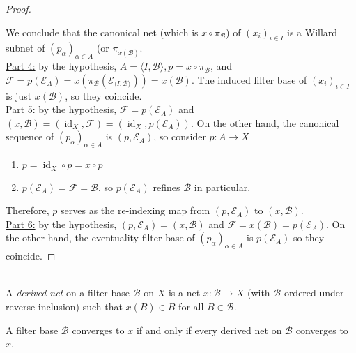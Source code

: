 \documentclass{treatise}
\begin{document}
\begin{proof}
\begin{enumerate}
\end{enumerate}
We conclude that the canonical net (which is $x \circ \pi_\mathcal{B}$) of $(x_i)_{i \in I}$ is a Willard subnet of $(p_\alpha)_{\alpha \in A}$ (or $\pi_{x(\mathcal{B})}$.
\\
\underline{Part 4:} by the hypothesis, $A = \langle I, \mathcal{B} \rangle, p = x \circ \pi_{\mathcal{B}}$, and $\mathcal{F} = p(\mathcal{E}_A) = x(\pi_\mathcal{B}(\mathcal{E}_{\langle I, \mathcal{B} \rangle})) = x(\mathcal{B})$. The induced filter base of $(x_i)_{i \in I}$ is just $x(\mathcal{B})$, so they coincide.
\\
\underline{Part 5:} by the hypothesis, $\mathcal{F} = p(\mathcal{E}_A)$ and $(x, \mathcal{B}) = (\operatorname{id}_X, \mathcal{F}) = (\operatorname{id}_X, p(\mathcal{E}_A))$. On the other hand, the canonical sequence of $(p_\alpha)_{\alpha \in A}$ is $(p, \mathcal{E}_A)$, so consider $p: A \to X$
\begin{enumerate}
    \item $p = \operatorname{id}_X \circ p = x \circ p$
    \item $p(\mathcal{E}_A) = \mathcal{F} = \mathcal{B}$, so $p(\mathcal{E}_A)$ refines $\mathcal{B}$ in particular.
\end{enumerate}
Therefore, $p$ serves as the re-indexing map from $(p, \mathcal{E}_A)$ to $(x, \mathcal{B})$.
\\
\underline{Part 6:} by the hypothesis, $(p, \mathcal{E}_A) = (x, \mathcal{B})$ and $\mathcal{F} = x(\mathcal{B}) = p(\mathcal{E}_A)$. On the other hand, the eventuality filter base of $(p_\alpha)_{\alpha \in A}$ is $p(\mathcal{E}_A)$ so they coincide.
\end{proof}
\ 
\\
A \emph{derived net} on a filter base $\mathcal{B}$ on $X$ is a net $x: \mathcal{B} \to X$ (with $\mathcal{B}$ ordered under reverse inclusion) such that $x(B) \in B$ for all $B \in \mathcal{B}$.
\begin{proposition}
A filter base $\mathcal{B}$ converges to $x$ if and only if every derived net on $\mathcal{B}$ converges to $x$.
\end{proposition}
\end{document}

